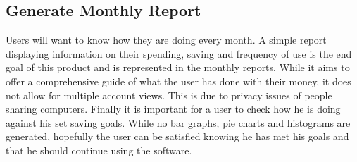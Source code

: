 \documentclass[12pt]{article}
\begin{document}
\subsection{Generate Monthly Report}
	Users will want to know how they are doing every month. A simple report displaying information on their spending, saving and frequency of use is the end goal of this product and is represented in the monthly reports. While it aims to offer a comprehensive guide of what the user has done with their money, it does not allow for multiple account views. This is due to privacy issues of people sharing computers. Finally it is important for a user to check how he is doing against his set saving goals. While no bar graphs, pie charts and histograms are generated, hopefully the user can be satisfied knowing he has met his goals and that he should continue using the software.
	
\end{document}
